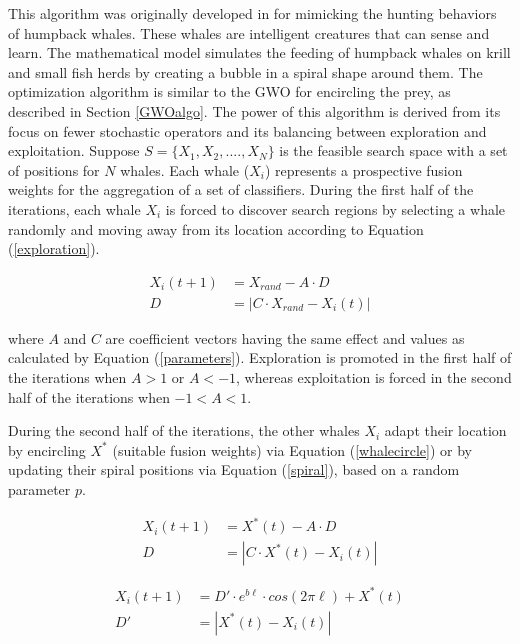 This algorithm was originally developed in \cite{mirjalili2016} for mimicking the hunting behaviors of humpback whales. These whales are intelligent creatures that can sense and learn. The mathematical model simulates the feeding of humpback whales on krill and small fish herds by creating a bubble in a spiral shape around them. The optimization algorithm is similar to the GWO for encircling the prey, as described in Section \ref{GWOalgo}. The power of this algorithm is derived from its focus on fewer stochastic operators and its balancing between exploration and exploitation. Suppose $S=\{X_1, X_2,...., X_N\}$ is the feasible search space with a set of positions for $N$ whales. Each whale ($X_i$) represents a prospective fusion weights for the aggregation of a set of classifiers. During the first half of the iterations, each whale $X_i$ is forced to discover search regions by selecting a whale randomly and moving away from its location according to Equation (\ref{exploration}).

\begin{equation}
	\label{exploration}
	\begin{aligned}
		X_i(t+1) & =X_{rand}- A \cdot D      \\
		D        & =|C\cdot X_{rand}-X_i(t)|
	\end{aligned}
\end{equation}




\noindent where $A$ and $C$ are coefficient vectors having the same effect and values as calculated by Equation (\ref{parameters}). Exploration is promoted in the first half of the iterations when $A > 1$ or $A < -1$, whereas exploitation is forced in the second half of the iterations when $-1 < A < 1$.


During the second half of the iterations, the other whales $X_i$ adapt their location by encircling $X^*$ (suitable fusion weights) via Equation (\ref{whalecircle}) or by updating their spiral positions via Equation (\ref{spiral}), based on a random parameter $p$.

\begin{equation}
	\label{whalecircle}
	\begin{aligned}
		X_i(t+1) & =X^*(t)-A \cdot D       \\
		D        & =|C\cdot X^*(t)-X_i(t)|
	\end{aligned}
\end{equation}


\begin{equation}\label{spiral}
	\begin{aligned}
		X_i(t+1) & = {D}' \cdot e^{b\ell} \cdot cos(2\pi \ell) + X^*(t) \\
		{D}'     & = | X^*(t)-X_i(t)|
	\end{aligned}
\end{equation}


